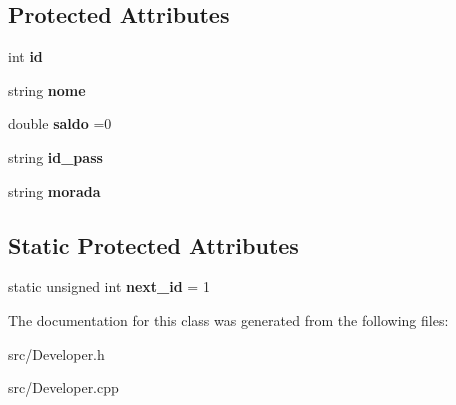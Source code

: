 \subsection*{Protected Attributes}
\begin{DoxyCompactItemize}
\item 
\hypertarget{class_developer_a4e09440e28b980b66fe81402b5878332}{int {\bfseries id}}\label{class_developer_a4e09440e28b980b66fe81402b5878332}

\item 
\hypertarget{class_developer_ac93712aacdeeed34b0d5ea3723be8639}{string {\bfseries nome}}\label{class_developer_ac93712aacdeeed34b0d5ea3723be8639}

\item 
\hypertarget{class_developer_a87c8d2a8bec77c561d29a82d93d34d40}{double {\bfseries saldo} =0}\label{class_developer_a87c8d2a8bec77c561d29a82d93d34d40}

\item 
\hypertarget{class_developer_a2747bee58df1c3c0a74a7932d1cb8d3e}{string {\bfseries id\+\_\+pass}}\label{class_developer_a2747bee58df1c3c0a74a7932d1cb8d3e}

\item 
\hypertarget{class_developer_af0287828e5cc0be78ee1d9b140405ff0}{string {\bfseries morada}}\label{class_developer_af0287828e5cc0be78ee1d9b140405ff0}

\end{DoxyCompactItemize}
\subsection*{Static Protected Attributes}
\begin{DoxyCompactItemize}
\item 
\hypertarget{class_developer_a54dcfbe646de46842a473b19ff56a3fd}{static unsigned int {\bfseries next\+\_\+id} = 1}\label{class_developer_a54dcfbe646de46842a473b19ff56a3fd}

\end{DoxyCompactItemize}


The documentation for this class was generated from the following files\+:\begin{DoxyCompactItemize}
\item 
src/Developer.\+h\item 
src/Developer.\+cpp\end{DoxyCompactItemize}
